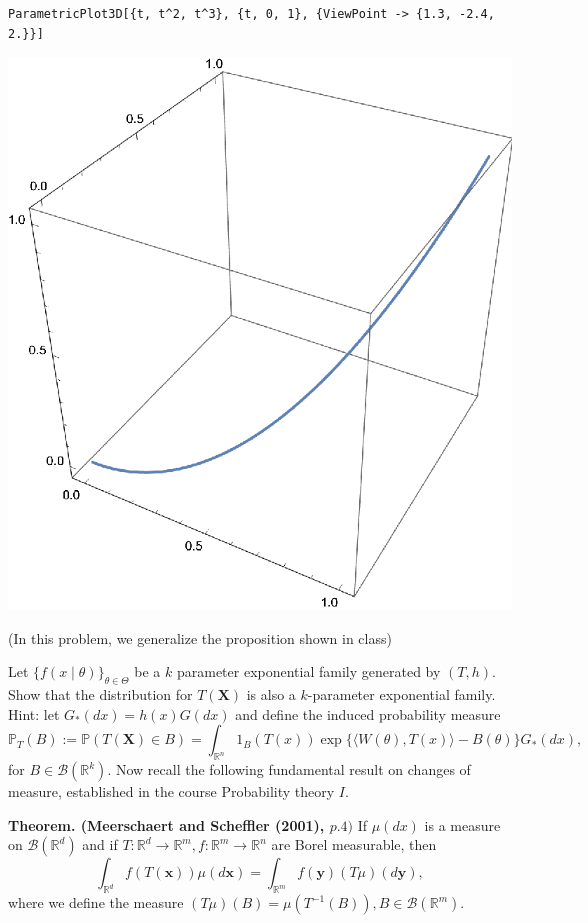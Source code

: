 \begin{solution}
\begin{enumerate}[(a)]
\begin{enumerate}[(a)]
\begin{verbatim}
ParametricPlot3D[{t, t^2, t^3}, {t, 0, 1}, {ViewPoint -> {1.3, -2.4, 2.}}]
\end{verbatim}
		\includegraphics{1.8.c.eps}
	\end{enumerate}
	\end{enumerate}
\end{solution}

\begin{ex}
	(In this problem, we generalize the proposition shown in class)

	Let \(\{f( x \mid \theta)\}_{\theta \in \Theta}\) be a \(k\) parameter exponential family generated by \((T, h)\). Show that the distribution for \(T(\mathbf{X})\) is also a \(k\)-parameter exponential family. Hint: let \(G_{*}(d  x)=h( x) G(d  x)\) and define the induced probability measure
	\[
		\mathbb{P}_{T}(B):=\mathbb{P}(T(\mathbf{X}) \in B)=\int_{\mathbb{R}^{n}} 1_{B}(T( x)) \exp \{\langle W(\theta), T( x)\rangle-B(\theta)\} G_{*}(d  x),
	\]
	for \(B \in \mathcal{B}\left(\mathbb{R}^{k}\right)\). Now recall the following fundamental result on changes of measure, established in the course Probability theory \(I\).

	{\bfseries Theorem. (Meerschaert and Scheffler (2001), \(p .4)\)} If \(\mu(d x)\) is a measure on \(\mathcal{B}\left(\mathbb{R}^{d}\right)\) and if \(T: \mathbb{R}^{d} \rightarrow \mathbb{R}^{m}, f: \mathbb{R}^{m} \rightarrow \mathbb{R}^{n}\) are Borel measurable, then
	\[
		\int_{\mathbb{R}^{d}} f(T(\boldsymbol{x})) \mu(d \boldsymbol{x})=\int_{\mathbb{R}^{m}} f(\boldsymbol{y})(T \mu)(d \boldsymbol{y}),
	\]
	where we define the measure \((T \mu)(B)=\mu\left(T^{-1}(B)\right), B \in \mathcal{B}\left(\mathbb{R}^{m}\right)\).
\end{ex}

